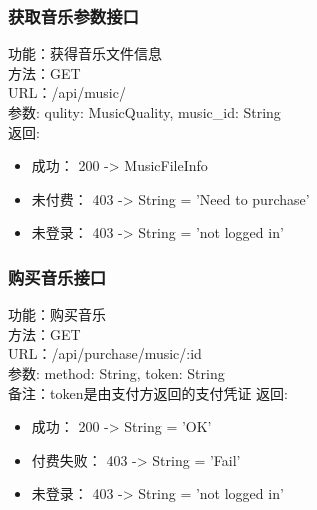 
\subsubsection{获取音乐参数接口}

\noindent
功能：获得音乐文件信息\\
方法：GET\\
URL：/api/music/\\
参数: qulity: MusicQuality, music\_id: String\\
返回:
\begin{itemize}
	\item 成功： 200 -> MusicFileInfo
	\item 未付费： 403 -> String = 'Need to purchase'
	\item 未登录： 403 -> String = 'not logged in'
\end{itemize}

\subsubsection{购买音乐接口}

\noindent
功能：购买音乐\\
方法：GET\\
URL：/api/purchase/music/:id\\
参数: method: String, token: String\\
备注：token是由支付方返回的支付凭证
返回:
\begin{itemize}
	\item 成功： 200 -> String = 'OK'
	\item 付费失败： 403 -> String = 'Fail'
	\item 未登录： 403 -> String = 'not logged in'
\end{itemize}


